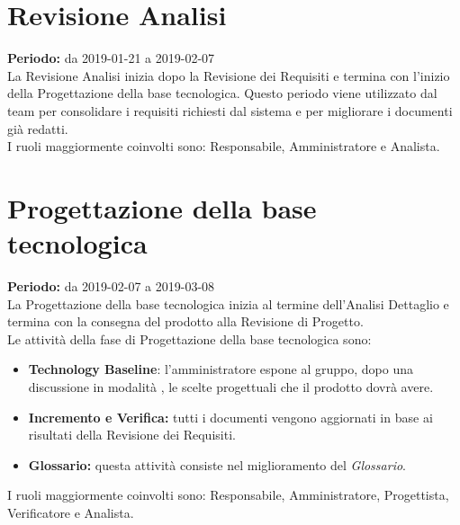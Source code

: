 \section{Revisione Analisi}
\textbf{Periodo:} da 2019-01-21 a 2019-02-07\\
La Revisione Analisi inizia dopo la Revisione dei Requisiti e termina con l’inizio della Progettazione della base tecnologica. Questo periodo viene utilizzato dal team per consolidare i requisiti richiesti dal sistema e per migliorare i documenti già redatti.\\I ruoli maggiormente coinvolti sono: Responsabile, Amministratore e Analista.

\section{Progettazione della base tecnologica}
\textbf{Periodo:} da 2019-02-07 a 2019-03-08\\
La Progettazione della base tecnologica inizia al termine dell’Analisi Dettaglio e termina con la consegna del prodotto alla Revisione di Progetto.\\
Le attività della fase di Progettazione della base tecnologica sono:
\begin{itemize}
    \item \textbf{Technology Baseline}: l'amministratore espone al gruppo, dopo una discussione in modalità , le scelte progettuali che il prodotto dovrà avere.
    \item \textbf{Incremento e Verifica:} tutti i documenti vengono aggiornati in base ai risultati della Revisione dei Requisiti.
    \item \textbf{Glossario:} questa attività consiste nel miglioramento del \textit{Glossario}.
\end{itemize}
I ruoli maggiormente coinvolti sono: Responsabile, Amministratore, Progettista, Verificatore e Analista.


